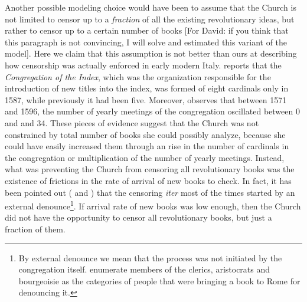 \documentclass[12pt]{article}
\begin{document}
Another possible modeling choice would have been to assume that the Church is not limited to censor up to a \textit{fraction} of all the existing revolutionary ideas, but rather to censor up to a certain number of books [For David: if you think that this paragraph is not convincing, I will solve and estimated this variant of the model]. Here we claim that this assumption is not better than ours at describing how censorship was actually enforced in early modern Italy.  reports that the \textit{Congregation of the Index}, which was the organization responsible for the introduction of new titles into the index, was formed of eight cardinals only in 1587, while previously it had been five. Moreover,  observes that between 1571 and 1596, the number of yearly meetings of the congregation oscillated between 0 and  and 34. These pieces of evidence suggest that the Church was not constrained by total number of books she could possibly analyze, because she could have easily increased them through an rise in the number of cardinals in the congregation or multiplication of the number of yearly meetings. Instead, what was preventing the Church from censoring all revolutionary books was the existence of frictions in the rate of arrival of new books to check. In fact, it has been pointed out ( and ) that the censoring \textit{iter} most of the times started by an external denounce\footnote{By external denounce we mean that the process was not initiated by the congregation itself.  enumerate members of the clerics, aristocrats and bourgeoisie as the categories of people that were bringing a book to Rome for denouncing it.}. If arrival rate of new books was low enough, then the Church did not have the opportunity to censor all revolutionary books, but just a fraction of them.
\end{document}
